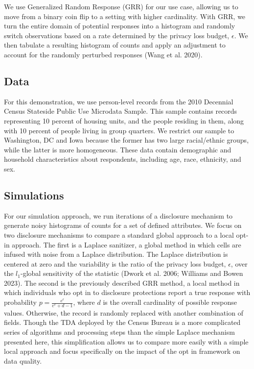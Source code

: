 \documentclass[
]{urban-formatting}
\begin{document}
We use Generalized Random Response (GRR) for our use case, allowing us
to move from a binary coin flip to a setting with higher cardinality.
With GRR, we turn the entire domain of potential responses into a
histogram and randomly switch observations based on a rate determined by
the privacy loss budget, \(\epsilon\). We then tabulate a resulting
histogram of counts and apply an adjustment to account for the randomly
perturbed responses (Wang et al. 2020).

\subsection{Data}

For this demonstration, we use person-level records from the 2010
Decennial Census Stateside Public Use Microdata Sample. This sample
contains records representing 10 percent of housing units, and the
people residing in them, along with 10 percent of people living in group
quarters. We restrict our sample to Washington, DC and Iowa because the
former has two large racial/ethnic groups, while the latter is more
homogeneous. These data contain demographic and household
characteristics about respondents, including age, race, ethnicity, and
sex.

\subsection{Simulations}

For our simulation approach, we run iterations of a disclosure mechanism
to generate noisy histograms of counts for a set of defined attributes.
We focus on two disclosure mechanisms to compare a standard global
approach to a local opt-in approach. The first is a Laplace sanitizer, a
global method in which cells are infused with noise from a Laplace
distribution. The Laplace distribution is centered at zero and the
variability is the ratio of the privacy loss budget, \(\epsilon\), over
the \(l_1\)-global sensitivity of the statistic (Dwork et al. 2006;
Williams and Bowen 2023). The second is the previously described GRR
method, a local method in which individuals who opt in to disclosure
protections report a true response with probability
\(p = \frac{e^\epsilon}{e^\epsilon + d - 1}\), where \(d\) is the
overall cardinality of possible response values. Otherwise, the record
is randomly replaced with another combination of fields. Though the TDA
deployed by the Census Bureau is a more complicated series of algorithms
and processing steps than the simple Laplace mechanism presented here,
this simplification allows us to compare more easily with a simple local
approach and focus specifically on the impact of the opt in framework on
data quality.
\end{document}
